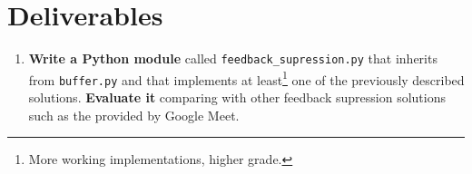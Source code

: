 \section{Deliverables}

\begin{enumerate}
\item
\textbf{Write a Python module} called \texttt{feedback\_supression.py} that inherits
from \texttt{buffer.py} and that implements at least\footnote{More
  working implementations, higher grade.} one of the previously
described solutions.
\textbf{Evaluate it} comparing with other feedback supression solutions such as the provided by Google Meet.
\end{enumerate}

\begin{comment}
More concretely:

\begin{enumerate}

\item If you implement the ``$s(t)$ delay and subtract solution'',
  you must estimate $a$, $d$ and perform the signals subtraction to
  remove the feedback signal ($s(t)$). 

\item In a ``$s(t)$ delay and subtract solution'', if you also
  consider the frequency response of the near-end audioset to estimate
  a better feedback signal, first you will need to find ${\mathbf H}$ (the
  discrete frequency response of your audioset). For this, the
  near-end speaker should generate an impulse signal
  ${\mathbf \delta}$, and in absence of any other sound signal, record
  the echo and compute its Fourier transform (it is a good idea to
  repeat this process several times to obtain a better estimation of
  ${\mathbf H}$). Finally, .

  Notice that the frequency characterization of the far-end audioset
  can be also used in a ``$n(t)$ delay and subtract
  solution''. Remember that filtering operations must be implemented
  with convolutions in the temporal domain, but are dot products in
  the frequency domain.
  
\item Use LMS to find a estimation of the echo signal and perform the
  echo cancellation. In this case, consider the use of a thread to
  compute the coefficients of the LMS filter
  (Equation~\eqref{eq:update} can run with a cadence much higher than
  a sample-time) and compute the estimated feedback signal
  (Equation~\eqref{eq:LMS_feedback}) for every chunk. Notice that for
  doing that, we will require the first $k$ samples of the next chunk.


\end{comment}
